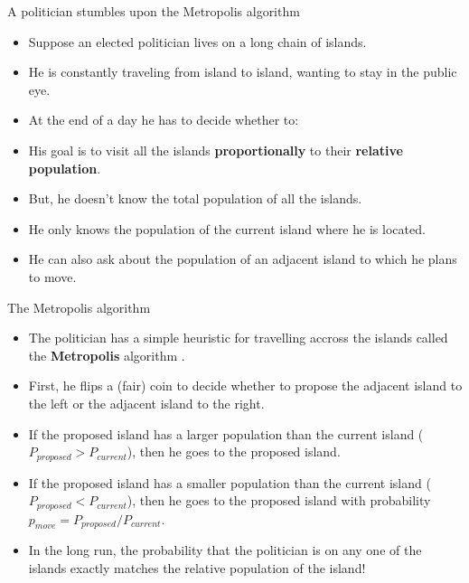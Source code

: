 \documentclass[handout]{beamer}
\begin{document}
\begin{frame}{A politician stumbles upon the Metropolis algorithm}
\scriptsize{

\begin{itemize}
\item Suppose an elected politician lives on a long chain of islands.
\item He is constantly traveling from island to island, wanting to stay in the public eye. 
\item At the end of a day he has to decide whether to:


\item His goal is to visit all the islands \textbf{proportionally} to their \textbf{relative population}.

\item But, he doesn't know the total population of all the islands.
\item He only knows the population of the current island where he is located.
\item He can also ask about the population of an adjacent island to which he plans to move.

\end{itemize}


} 
\end{frame}


\begin{frame}{The Metropolis algorithm}
\scriptsize{

\begin{itemize}
\item The politician has a simple heuristic for travelling accross the islands called the \textbf{Metropolis} algorithm \cite{metropolis1953equation}.

\item First, he flips a (fair) coin to decide whether to propose the adjacent island to the left or the adjacent island to the right.

\item If the proposed island has a larger population than
the current island ($P_{proposed}>P_{current}$), then he  goes to the proposed island.

\item If the proposed island has a smaller population than the current island ($P_{proposed}<P_{current}$), then he goes to the proposed island with probability $p_{move}=P_{proposed}/P_{current}$.


\item In the long run, the probability that the politician is on any one of the islands exactly matches the relative population of the island!

\end{itemize}


} 
\end{frame}
\end{document}
